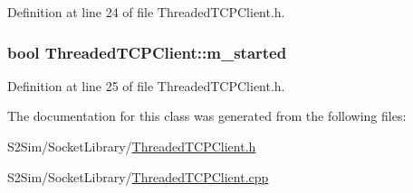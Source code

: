 Definition at line 24 of file Threaded\-T\-C\-P\-Client.\-h.

\hypertarget{class_threaded_t_c_p_client_a32d0d8b7239c8eda6ff9d4ab45de5e8e}{
\subsubsection[{m\-\_\-started}]{\setlength{\rightskip}{0pt plus 5cm}bool Threaded\-T\-C\-P\-Client\-::m\-\_\-started\hspace{0.3cm}{\ttfamily [private]}}}\label{class_threaded_t_c_p_client_a32d0d8b7239c8eda6ff9d4ab45de5e8e}


Definition at line 25 of file Threaded\-T\-C\-P\-Client.\-h.



The documentation for this class was generated from the following files\-:\begin{DoxyCompactItemize}
\item 
S2\-Sim/\-Socket\-Library/\hyperlink{_threaded_t_c_p_client_8h}{Threaded\-T\-C\-P\-Client.\-h}\item 
S2\-Sim/\-Socket\-Library/\hyperlink{_threaded_t_c_p_client_8cpp}{Threaded\-T\-C\-P\-Client.\-cpp}\end{DoxyCompactItemize}
